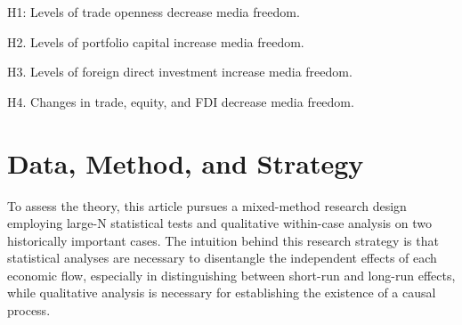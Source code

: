 \documentclass[12pt,a4paper]{article}\usepackage[]{graphicx}\usepackage[]{color}
\begin{document}
H1: Levels of trade openness decrease media freedom.

H2. Levels of portfolio capital increase media freedom.

H3. Levels of foreign direct investment increase media freedom.

H4. Changes in trade, equity, and FDI decrease media freedom.

\section{Data, Method, and Strategy}

To assess the theory, this article pursues a mixed-method research design employing large-N statistical tests and qualitative within-case analysis on two historically important cases. The intuition behind this research strategy is that statistical analyses are necessary to disentangle the independent effects of each economic flow, especially in distinguishing between short-run and long-run effects, while qualitative analysis is necessary for establishing the existence of a causal process.
\end{document}
